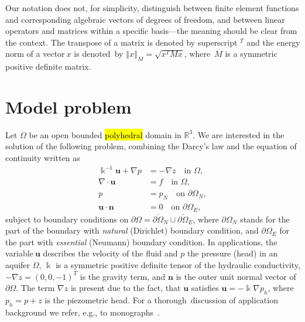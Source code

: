Our notation does not, for simplicity, distinguish between finite element
functions and corresponding algebraic vectors of degrees of freedom, and
between linear operators and matrices within a specific basis---the meaning should be
clear from the context. The transpose of a matrix is denoted by superscript $^{T}$ and the energy
norm of a vector$~x$ is denoted\ by $\left\Vert x\right\Vert _{M}=\sqrt
{x^{T}Mx}$, where~$M$ is a symmetric positive definite matrix.

\section{Model problem}

\label{sec:model}

Let $\Omega$ be an open bounded \hl{polyhedral} domain in $\mathbb{R}^{3}$. We are
interested in the solution of the following problem, combining the Darcy's law
and the equation of continuity written as
\begin{align}
\Bbbk^{-1}\mathbf{u}+\nabla p  &  =-\nabla z\quad\text{in }\Omega
,\label{eq:problem-1}\\
\nabla\cdot\mathbf{u}  &  =f\quad\text{in }\Omega,\label{eq:problem-2}\\
p  &  =p_{N}\quad\text{on }\partial\Omega_{N},\label{eq:problem-3}\\
\mathbf{u}\cdot\mathbf{n}  &  =0\quad\text{on }\partial\Omega_{E},
\label{eq:problem-4}%
\end{align}
subject to boundary conditions on $\partial\Omega=\overline{\partial\Omega
}_{N}\cup\overline{\partial\Omega}_{E}$, where $\partial\Omega_{N}$ stands for
the part of the boundary with \emph{natural} (Dirichlet) boundary condition,
and $\partial\Omega_{E}$ for the part with \emph{essential} (Neumann) boundary
condition. In applications, the variable$~\mathbf{u}$ describes the velocity
of the fluid and $p$ the pressure (head) in an aquifer $\Omega$, $\Bbbk$ is a
symmetric positive definite tensor of the hydraulic conductivity, $-\nabla
z=(0,0,-1)^{T}$ is the gravity term, and $\mathbf{n}$ is the outer unit normal
vector of $\partial\Omega$. The term $\nabla z$ is present due to the fact,
that $\mathbf{u}$ satisfies $\mathbf{u}=-\Bbbk\nabla p_{h}$, where $p_{h}=p+z$
is the piezometric head. For a thorough\ discussion of application background
we refer, e.g., to monographs~\cite{Bear-1988-DFP,Chen-2006-CMM}.

